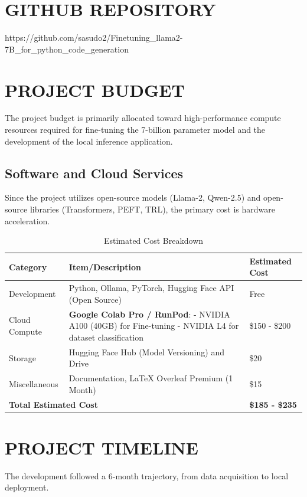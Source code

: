 \section{GITHUB REPOSITORY}
https://github.com/sasudo2/Finetuning\_llama2-7B\_for\_python\_code\_generation


\section{PROJECT BUDGET}
The project budget is primarily allocated toward high-performance compute resources required for fine-tuning the 7-billion parameter model and the development of the local inference application.

\subsection{Software and Cloud Services}
Since the project utilizes open-source models (Llama-2, Qwen-2.5) and open-source libraries (Transformers, PEFT, TRL), the primary cost is hardware acceleration.

\begin{table}[H]
    \centering
    \small
    \caption{Estimated Cost Breakdown}
    \begin{tabular}{p{2.7cm}p{6.5cm}p{2.5cm}}
        \toprule
        \textbf{Category} & \textbf{Item/Description} & \textbf{Estimated Cost} \\
        \midrule
        Development & Python, Ollama, PyTorch, Hugging Face API (Open Source) & Free \\
        Cloud Compute & \textbf{Google Colab Pro / RunPod}: \newline
        - NVIDIA A100 (40GB) for Fine-tuning \newline
        - NVIDIA L4 for dataset classification & \$150 - \$200 \\
        Storage & Hugging Face Hub (Model Versioning) and Drive & \$20 \\
        Miscellaneous & Documentation, LaTeX Overleaf Premium (1 Month) & \$15 \\
        \midrule
        \multicolumn{2}{l}{\textbf{Total Estimated Cost}} & \textbf{\$185 - \$235} \\
        \bottomrule
    \end{tabular}
    \label{tab:project_budget_final}
\end{table}

\section{PROJECT TIMELINE}
The development followed a 6-month trajectory, from data acquisition to local deployment.


